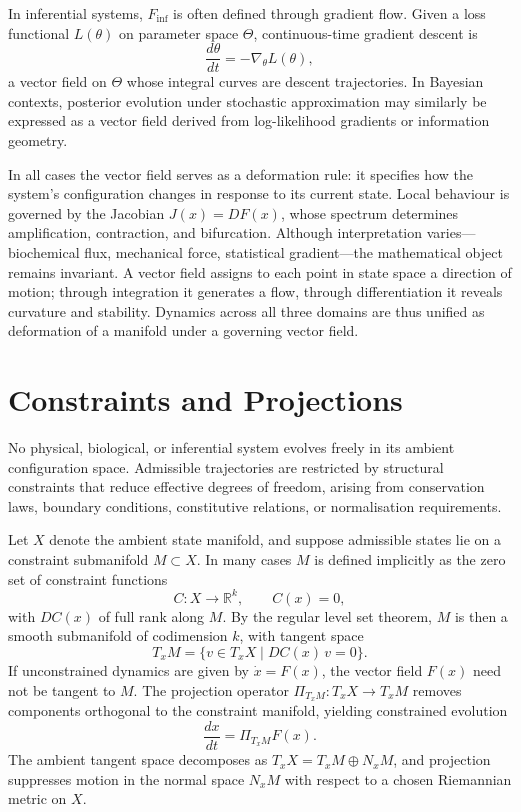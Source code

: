\documentclass[12pt]{book}
\begin{document}
In inferential systems, $F_{\text{inf}}$ is often defined through gradient
flow. Given a loss functional $L(\theta)$ on parameter space $\Theta$,
continuous-time gradient descent is
\[
  \frac{d\theta}{dt} = -\nabla_\theta L(\theta),
\]
a vector field on $\Theta$ whose integral curves are descent trajectories. In
Bayesian contexts, posterior evolution under stochastic approximation may
similarly be expressed as a vector field derived from log-likelihood gradients
or information geometry.

In all cases the vector field serves as a deformation rule: it specifies how
the system's configuration changes in response to its current state. Local
behaviour is governed by the Jacobian $J(x) = DF(x)$, whose spectrum
determines amplification, contraction, and bifurcation. Although
interpretation varies---biochemical flux, mechanical force, statistical
gradient---the mathematical object remains invariant. A vector field assigns
to each point in state space a direction of motion; through integration it
generates a flow, through differentiation it reveals curvature and stability.
Dynamics across all three domains are thus unified as deformation of a manifold
under a governing vector field.

\section{Constraints and Projections}

No physical, biological, or inferential system evolves freely in its ambient
configuration space. Admissible trajectories are restricted by structural
constraints that reduce effective degrees of freedom, arising from conservation
laws, boundary conditions, constitutive relations, or normalisation
requirements.

Let $X$ denote the ambient state manifold, and suppose admissible states lie
on a constraint submanifold $M \subset X$. In many cases $M$ is defined
implicitly as the zero set of constraint functions
\[
  C : X \to \mathbb{R}^k, \qquad C(x) = 0,
\]
with $DC(x)$ of full rank along $M$. By the regular level set theorem, $M$ is
then a smooth submanifold of codimension $k$, with tangent space
\[
  T_x M = \{ v \in T_x X \mid DC(x)\, v = 0 \}.
\]
If unconstrained dynamics are given by $\dot{x} = F(x)$, the vector field
$F(x)$ need not be tangent to $M$. The projection operator
$\Pi_{T_x M} : T_x X \to T_x M$ removes components orthogonal to the
constraint manifold, yielding constrained evolution
\[
  \frac{dx}{dt} = \Pi_{T_x M} F(x).
\]
The ambient tangent space decomposes as $T_x X = T_x M \oplus N_x M$, and
projection suppresses motion in the normal space $N_x M$ with respect to a
chosen Riemannian metric on $X$.
\end{document}
